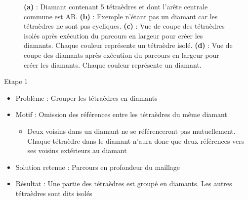 \documentclass[9pt]{beamer}
\begin{document}
\begin{frame}
\begin{figure}[H]
\begin{subfigure}{.24\textwidth}
  \caption{}
\end{subfigure}
\caption{\textbf{(a)} : Diamant contenant 5 tétraèdres et dont l'arête centrale commune est AB. \textbf{(b)} : Exemple n'étant pas un diamant car les tétraèdres ne sont pas cycliques. \textbf{(c)} : Vue de coupe des tétraèdres isolés après exécution du parcours en largeur pour créer les diamants. Chaque couleur représente un tétraèdre isolé. \textbf{(d)} : Vue de coupe des diamants après exécution du parcours en largeur pour créer les diamants. Chaque couleur représente un diamant.}
\end{figure}
\begin{block}{Etape 1}
\begin{itemize}
\item Problème : Grouper les tétraèdres en diamants
\item Motif : Omission des références entre les tétraèdres du même diamant
\begin{itemize}
\item Deux voisins dans un diamant ne se référenceront pas mutuellement. Chaque tétraèdre dans le diamant n'aura donc que deux références vers ses voisins extérieurs au diamant
\end{itemize}
\item Solution retenue : Parcours en profondeur du maillage
\item Résultat : Une partie des tétraèdres est groupé en diamants. Les autres tétraèdres sont dits isolés
\end{itemize}
\end{block}
\end{frame}
\end{document}
